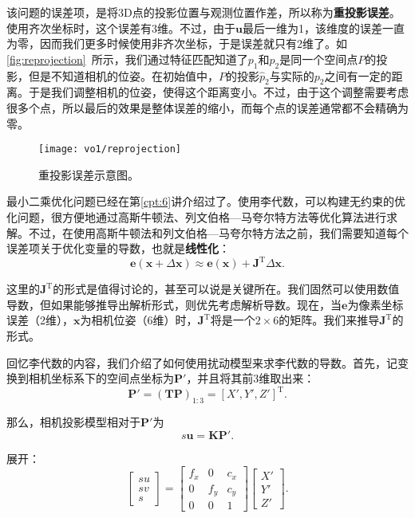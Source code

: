 该问题的误差项，是将3D点的投影位置与观测位置作差，所以称为\textbf{重投影误差}。使用齐次坐标时，这个误差有3维。不过，由于${\bm{u}}$最后一维为1，该维度的误差一直为零，因而我们更多时候使用非齐次坐标，于是误差就只有2维了。如\autoref{fig:reprojection}~所示，我们通过特征匹配知道了$p_1$和$p_2$是同一个空间点$P$的投影，但是不知道相机的位姿。在初始值中，$P$的投影$\hat{p}_2$与实际的$p_2$之间有一定的距离。于是我们调整相机的位姿，使得这个距离变小。不过，由于这个调整需要考虑很多个点，所以最后的效果是整体误差的缩小，而每个点的误差通常都不会精确为零。

\begin{figure}[!htp]
	\centering
	\texttt{[image: vo1/reprojection]}
	\caption{重投影误差示意图。}
	\label{fig:reprojection}
\end{figure}

最小二乘优化问题已经在第\ref{cpt:6}讲介绍过了。使用李代数，可以构建无约束的优化问题，很方便地通过高斯牛顿法、列文伯格—马夸尔特方法等优化算法进行求解。不过，在使用高斯牛顿法和列文伯格—马夸尔特方法之前，我们需要知道每个误差项关于优化变量的导数，也就是\textbf{线性化}：
\begin{equation}
\bm{e}( \bm{x} + \Delta \bm{x} ) \approx \bm{e}(\bm{x}) + \bm{J} ^\mathrm{T}\Delta \bm{x}.
\end{equation}

这里的$\bm{J}^\mathrm{T}$的形式是值得讨论的，甚至可以说是关键所在。我们固然可以使用数值导数，但如果能够推导出解析形式，则优先考虑解析导数。现在，当$\bm{e}$为像素坐标误差（2维），$\bm{x}$为相机位姿（6维）时，$\bm{J}^\mathrm{T}$将是一个$2 \times 6$的矩阵。我们来推导$\bm{J}^\mathrm{T}$的形式。

回忆李代数的内容，我们介绍了如何使用扰动模型来求李代数的导数。首先，记变换到相机坐标系下的空间点坐标为$\bm{P}'$，并且将其前3维取出来：
\begin{equation}
\bm{P}' = \left( \bm{T}{\bm{P}} \right)_{1:3}= [X', Y', Z']^\mathrm{T}.
\end{equation}

那么，相机投影模型相对于$\bm{P}'$为
\begin{equation}
s {\bm{u}} = \bm{K} \bm{P}'.
\end{equation}

展开：
\begin{equation}
\left[ \begin{array}{l}
su\\
sv\\
s
\end{array} \right] = \left[ {\begin{array}{*{20}{c}}
	{{f_x}}&0&{{c_x}}\\
	0&{{f_y}}&{{c_y}}\\
	0&0&1
	\end{array}} \right]\left[ \begin{array}{l}
X'\\
Y'\\
Z'
\end{array} \right].
\end{equation}


